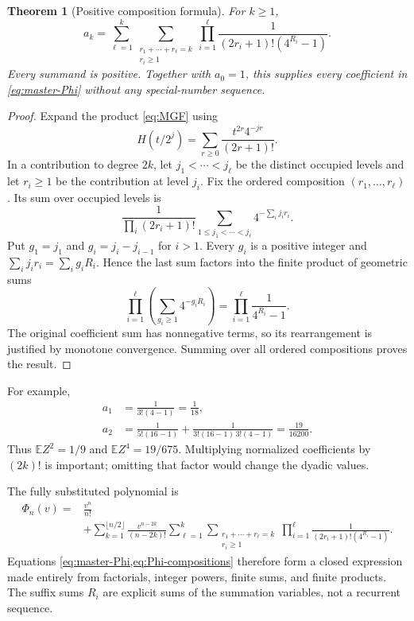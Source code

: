 \documentclass[11pt,a4paper]{article}
\numberwithin{equation}{section}
\newtheorem{theorem}{Theorem}[section]
\theoremstyle{definition}
\theoremstyle{remark}
\newcommand{\E}{\mathbb E}
\begin{document}
\begin{theorem}[Positive composition formula]
\label{thm:compositions}
For $k\ge1$,
\begin{equation}
 \boxed{\displaystyle
 a_k=\sum_{\ell=1}^{k}
       \sum_{\substack{r_1+\cdots+r_\ell=k\\r_i\ge1}}
       \prod_{i=1}^{\ell}
       \frac1{(2r_i+1)!(4^{R_i}-1)}.}
 \label{eq:a-compositions}
\end{equation}
Every summand is positive. Together with $a_0=1$, this supplies every coefficient in \cref{eq:master-Phi} without any special-number sequence.
\end{theorem}
\begin{proof}
Expand the product \cref{eq:MGF} using
\[
 H(t/2^j)=\sum_{r\ge0}\frac{t^{2r}4^{-jr}}{(2r+1)!}.
\]
In a contribution to degree $2k$, let $j_1<\cdots<j_\ell$ be the distinct occupied levels and let $r_i\ge1$ be the contribution at level $j_i$. Fix the ordered composition $(r_1,\ldots,r_\ell)$. Its sum over occupied levels is
\[
 \frac1{\prod_i(2r_i+1)!}
 \sum_{1\le j_1<\cdots<j_\ell}4^{-\sum_i j_i r_i}.
\]
Put $g_1=j_1$ and $g_i=j_i-j_{i-1}$ for $i>1$. Every $g_i$ is a positive integer and $\sum_i j_ir_i=\sum_i g_iR_i$. Hence the last sum factors into the finite product of geometric sums
\[
 \prod_{i=1}^{\ell}\left(\sum_{g_i\ge1}4^{-g_iR_i}\right)
 =\prod_{i=1}^{\ell}\frac1{4^{R_i}-1}.
\]
The original coefficient sum has nonnegative terms, so its rearrangement is justified by monotone convergence. Summing over all ordered compositions proves the result.
\end{proof}

For example,
\begin{align}
 a_1&=\frac1{3!(4-1)}=\frac1{18},\\
 a_2&=\frac1{5!(16-1)}+
       \frac1{3!(16-1)\,3!(4-1)}
      =\frac{19}{16200}.
 \label{eq:a-small}
\end{align}
Thus $\E Z^2=1/9$ and $\E Z^4=19/675$. Multiplying normalized coefficients by $(2k)!$ is important; omitting that factor would change the dyadic values.

The fully substituted polynomial is
\begin{equation}
\begin{split}
 \Phi_n(v)={}&\frac{v^n}{n!}\\
 &+\sum_{k=1}^{\lfloor n/2\rfloor}\frac{v^{n-2k}}{(n-2k)!}
  \sum_{\ell=1}^{k}
  \sum_{\substack{r_1+\cdots+r_\ell=k\\r_i\ge1}}
  \prod_{i=1}^{\ell}\frac1{(2r_i+1)!(4^{R_i}-1)}.
\end{split}
\label{eq:Phi-compositions}
\end{equation}
Equations \cref{eq:master-Phi,eq:Phi-compositions} therefore form a closed expression made entirely from factorials, integer powers, finite sums, and finite products. The suffix sums $R_i$ are explicit sums of the summation variables, not a recurrent sequence.
\end{document}

